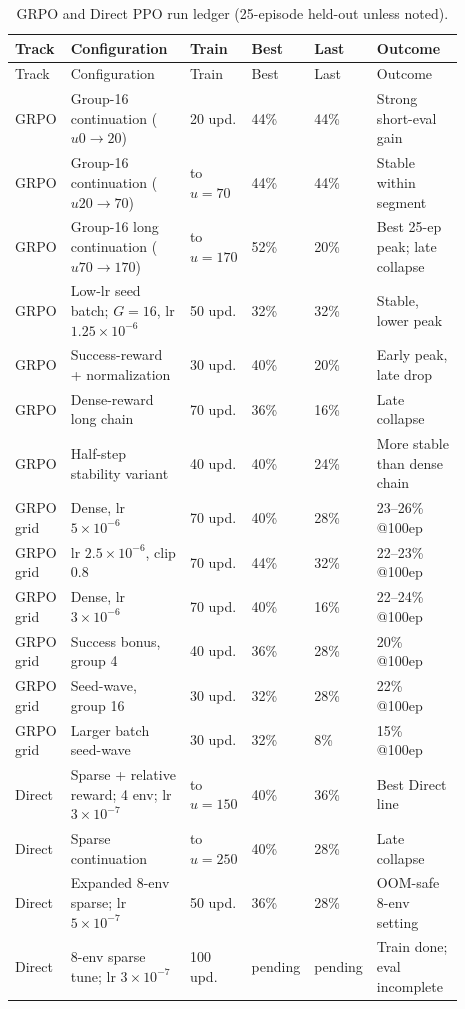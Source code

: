 \begin{landscape}
\scriptsize
\setlength{\tabcolsep}{3pt}
\begin{longtable}{@{}p{0.11\linewidth}p{0.30\linewidth}p{0.10\linewidth}p{0.08\linewidth}p{0.08\linewidth}p{0.22\linewidth}@{}}
\caption{GRPO and Direct PPO run ledger (25-episode held-out unless noted).}\label{tab:supp-grpo-direct-ledger}\\
\toprule
Track & Configuration & Train & Best & Last & Outcome \\
\midrule
\endfirsthead
\toprule
Track & Configuration & Train & Best & Last & Outcome \\
\midrule
\endhead
GRPO & Group-16 continuation ($u0{\rightarrow}20$) & 20 upd. & 44\% & 44\% & Strong short-eval gain \\
GRPO & Group-16 continuation ($u20{\rightarrow}70$) & to $u{=}70$ & 44\% & 44\% & Stable within segment \\
GRPO & Group-16 long continuation ($u70{\rightarrow}170$) & to $u{=}170$ & 52\% & 20\% & Best 25-ep peak; late collapse \\
GRPO & Low-lr seed batch; $G{=}16$, lr $1.25{\times}10^{-6}$ & 50 upd. & 32\% & 32\% & Stable, lower peak \\
GRPO & Success-reward + normalization & 30 upd. & 40\% & 20\% & Early peak, late drop \\
GRPO & Dense-reward long chain & 70 upd. & 36\% & 16\% & Late collapse \\
GRPO & Half-step stability variant & 40 upd. & 40\% & 24\% & More stable than dense chain \\
GRPO grid & Dense, lr $5{\times}10^{-6}$ & 70 upd. & 40\% & 28\% & 23--26\% @100ep \\
GRPO grid & lr $2.5{\times}10^{-6}$, clip 0.8 & 70 upd. & 44\% & 32\% & 22--23\% @100ep \\
GRPO grid & Dense, lr $3{\times}10^{-6}$ & 70 upd. & 40\% & 16\% & 22--24\% @100ep \\
GRPO grid & Success bonus, group 4 & 40 upd. & 36\% & 28\% & 20\% @100ep \\
GRPO grid & Seed-wave, group 16 & 30 upd. & 32\% & 28\% & 22\% @100ep \\
GRPO grid & Larger batch seed-wave & 30 upd. & 32\% & 8\% & 15\% @100ep \\
Direct & Sparse + relative reward; 4 env; lr $3{\times}10^{-7}$ & to $u{=}150$ & 40\% & 36\% & Best Direct line \\
Direct & Sparse continuation & to $u{=}250$ & 40\% & 28\% & Late collapse \\
Direct & Expanded 8-env sparse; lr $5{\times}10^{-7}$ & 50 upd. & 36\% & 28\% & OOM-safe 8-env setting \\
Direct & 8-env sparse tune; lr $3{\times}10^{-7}$ & 100 upd. & pending & pending & Train done; eval incomplete \\
\bottomrule
\end{longtable}
\end{landscape}

